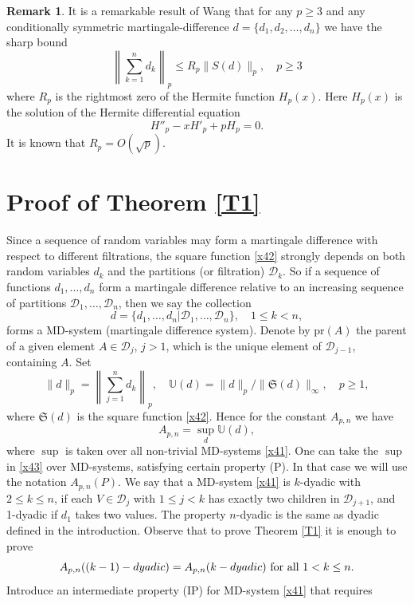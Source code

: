 \documentclass[12pt,reqno,fleqn]{amsart}
\theoremstyle{definition}
\theoremstyle{definition}
\newtheorem{remark}{Remark}[section]
\theoremstyle{remark}
\def\ZU{\ensuremath{\mathbb U}}
\def\ZS{\ensuremath{\mathfrak S}}
\def\ZD{\ensuremath{\mathscr  D}}
\def\pr{\ensuremath{\mathrm {pr}}}
\numberwithin{equation}{section}
\newcommand {\e }[1]{\eqref{#1}}
\newcommand {\trm }[1]{Theorem \ref{#1}}
\begin{document}
\begin{remark}
	It is a remarkable result of Wang \cite{Wang} that for any $p\ge 3$ and any conditionally symmetric martingale-difference $d=\{d_1,d_2,\ldots,d_n\}$ we have the sharp bound
	\begin{equation}
	\left\|\sum_{k=1}^nd_k\right\|_p\le R_p\|S(d)\|_p,\quad p\ge 3
	\end{equation}
	where $R_p$ is the rightmost zero of the Hermite function $H_p(x)$. Here $H_p(x)$ is the solution of
	the Hermite differential equation
	\begin{equation}
		H''_p-xH'_p+pH_p=0.
	\end{equation}
It is known that $R_p=O(\sqrt{p})$.
\end{remark}
\section{Proof of \trm{T1}}
Since a sequence of random variables may form a martingale difference with respect to different filtrations, the square function \e{x42} 
strongly depends on both random variables $d_k$ and the partitions (or filtration) $\ZD_k$. So if a sequence of functions  $d_1,\ldots,d_n$ form a martingale difference relative to an increasing sequence of partitions $\ZD_1,\ldots,\ZD_n$, then we say the collection 
	\begin{equation}\label{x41}
	d=\{d_1,\ldots,d_n|\ZD_1,\ldots,\ZD_n\},\quad 1\le k<n, 
\end{equation}
forms a MD-system (martingale difference system).  Denote by $\pr(A)$ the parent of a given element $A\in \ZD_j$, $j>1$, which is the unique element of $\ZD_{j-1}$, containing $A$. Set
\begin{equation}
	\|d\|_p=\left\|\sum_{j=1}^nd_k\right\|_p,\quad  \ZU(d)=\|d\|_p/\|\ZS(d)\|_\infty, \quad p\ge 1,
\end{equation}
where $\ZS(d)$ is the square function \e{x42}. Hence for the constant $A_{p,n}$ we have
\begin{equation}\label{x43}
	A_{p,n}=\sup_d\ZU(d),
\end{equation}
where $\sup$ is taken over all non-trivial MD-systems \e{x41}. One can take the $\sup$ in \e{x43} over MD-systems, satisfying certain property (P). In that case we will use the notation $A_{p,n}(P)$. We say that a MD-system \e{x41} is $k$-dyadic with $2\le k\le n$, if each $V\in \ZD_j$ with $1\le j<k$ has exactly two children in $\ZD_{j+1}$, and 1-dyadic if $d_1$ takes two values. The property $n$-dyadic is the same as dyadic defined in the introduction. Observe that to prove \trm{T1} it is enough to prove 
\begin{equation}\label{x44}
	A_{p,n}((k-1)-{\rm dyadic})=A_{p,n}(k-{\rm dyadic})\hbox{ for all }1< k\le n. 
\end{equation}
Introduce an intermediate property ({\rm IP}) for MD-system \e{x41} that requires
\end{document}
